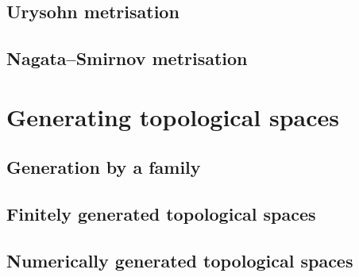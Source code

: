 \documentclass[a4paper,nobib,nols]{tufte-book}
\begin{document}
\section{Urysohn metrisation}%
\label{sec:urysohn_metrisation}

\section{Nagata--Smirnov metrisation}%
\label{sec:nagata_smirnov_metrisation}

\chapter{Generating topological spaces}%
\label{cha:generating_topological_spaces}

\section{Generation by a family}%
\label{sec:generation_by_a_family}

\section{Finitely generated topological spaces}%
\label{sec:finitely_generated_topological_spaces}

\section{Numerically generated topological spaces}%
\label{sec:numerically_generated_topological_spaces}
\end{document}
